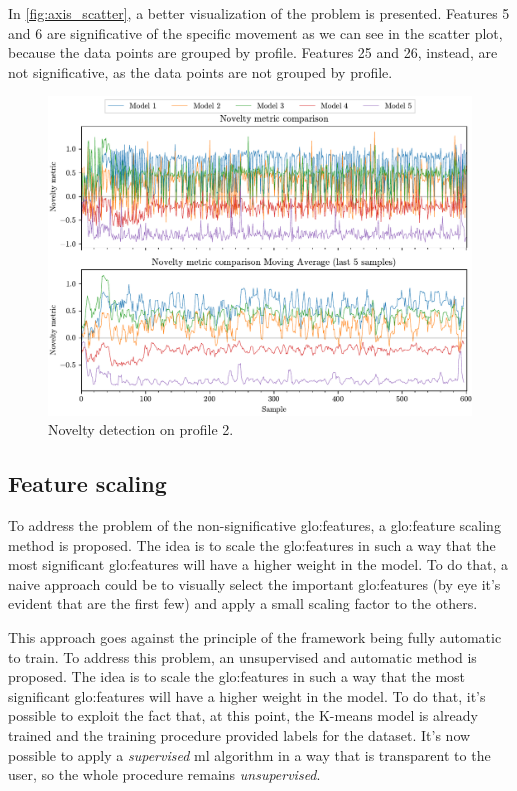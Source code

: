 In \autoref{fig:axis_scatter}, a better visualization of the problem is presented. Features 5 and 6 are significative of the specific movement as we can see in the scatter plot, because the data points are grouped by profile. Features 25 and 26, instead, are not significative, as the data points are not grouped by profile.



\begin{figure}
    \centering
    \includegraphics[angle=-90,origin=c]{images/LinearMotor/Testing.pdf}
    \caption{Novelty detection on profile 2.}
    \label{fig:axis_testing}
\end{figure}
\clearpage


\subsection{Feature scaling}
To address the problem of the non-significative \gls{glo:feature}s, a \gls{glo:feature} scaling method is proposed. The idea is to scale the \gls{glo:feature}s in such a way that the most significant \gls{glo:feature}s will have a higher weight in the model. To do that, a naive approach could be to visually select the important \gls{glo:feature}s (by eye it's evident that are the first few) and apply a small scaling factor to the others. 

This approach goes against the principle of the framework being fully automatic to train. To address this problem, an unsupervised and automatic method is proposed. The idea is to scale the \gls{glo:feature}s in such a way that the most significant \gls{glo:feature}s will have a higher weight in the model. To do that, it's possible to exploit the fact that, at this point, the K-means model is already trained and the training procedure provided labels for the dataset. It's now possible to apply a \emph{supervised} \gls{ml} algorithm in a way that is transparent to the user, so the whole procedure remains \emph{unsupervised}.

